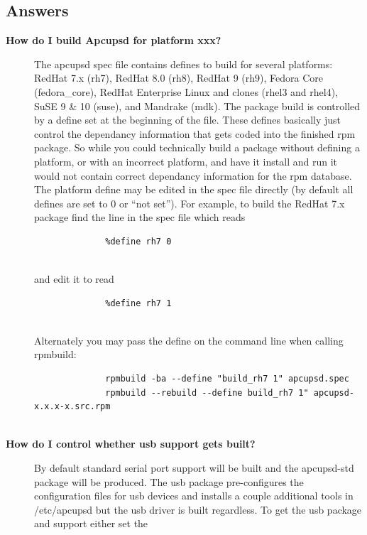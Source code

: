 {{{{{{{{{{{{\label{Answers}

\subsection*{Answers}

\begin{description}

\item [{\bf How do I build Apcupsd for platform xxx?}]
   The apcupsd spec file contains defines to build for several platforms: RedHat
7.x (rh7), RedHat 8.0 (rh8), RedHat 9 (rh9), Fedora Core (fedora\_core), RedHat
Enterprise Linux and clones (rhel3 and rhel4), SuSE 9 \& 10 (suse), and Mandrake (mdk).  
The package build is controlled by a define set at the beginning of the file. 
These defines basically just control the dependancy information that gets coded into 
the finished rpm package.  So while you could technically build a package without 
defining a platform, or with an incorrect platform, and have it install and run it would 
not contain correct dependancy information for the rpm database.  The platform define may
be edited in the spec file directly (by default all defines are set to 0 or
``not set'').  For example, to build the RedHat 7.x package find the line in
the spec file which reads  

\footnotesize
\begin{verbatim}
              %define rh7 0
     
\end{verbatim}
\normalsize

and edit it to read  

\footnotesize
\begin{verbatim}
              %define rh7 1
     
\end{verbatim}
\normalsize

Alternately you may pass the define on the command line when calling rpmbuild:
 

\footnotesize
\begin{verbatim}
              rpmbuild -ba --define "build_rh7 1" apcupsd.spec
              rpmbuild --rebuild --define build_rh7 1" apcupsd-x.x.x-x.src.rpm
     
\end{verbatim}
\normalsize


\item [{\bf How do I control whether usb support gets built?}]
   By default standard serial port support will be built and the apcupsd-std
package will be produced.  The usb package pre-configures the configuration files 
for usb devices and installs a couple additional tools in /etc/apcupsd but the usb 
driver is built regardless.  To get the usb package and support either set the  


\end{description}}}}}}}}}}}}}
